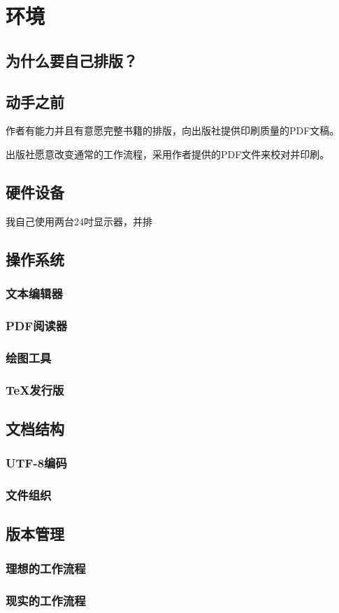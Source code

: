 \chapter{环境}

\section{为什么要自己排版？}
\label{sec:whyTypesetting}

\section{动手之前}
作者有能力并且有意愿完整书籍的排版，向出版社提供印刷质量的PDF文稿。

出版社愿意改变通常的工作流程，采用作者提供的PDF文件来校对并印刷。


\section{硬件设备}
我自己使用两台24吋显示器，并排

\section{操作系统}
\subsection{文本编辑器}
\subsection{PDF阅读器}
\subsection{绘图工具}

\subsection{\TeX 发行版}
\section{文档结构}
\subsection{UTF-8编码}
\subsection{ 文件组织}

\section{版本管理}
\subsection{理想的工作流程}
\subsection{现实的工作流程}

